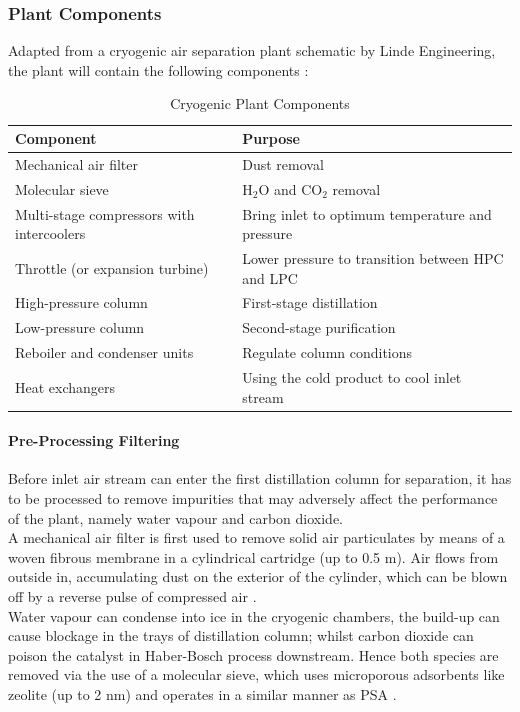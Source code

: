 \documentclass[11pt,oneside]{article}
\let\subsubsubsection\paragraph
\begin{document}
	\subsubsection{Plant Components} \noindent
    Adapted from a cryogenic air separation plant schematic by Linde Engineering, the plant will contain the following components \citep{linde_cryo}:
    \begin{table}[ht]
        \singlespacing
    	\centering
	    \caption{Cryogenic Plant Components}
	    \label{table:plant_components}

	    \begin{tabular}{|l|l|}
	    \hline
	    Component						& Purpose \\        \hline
	    Mechanical air filter 			& Dust removal \\
	    Molecular sieve					& H$_2$O and CO$_2$ removal \\
	    Multi-stage compressors with intercoolers & Bring inlet to optimum temperature and pressure\\
	    Throttle (or expansion turbine)	& Lower pressure to transition between HPC and LPC\\
	    High-pressure column			& First-stage distillation \\
	    Low-pressure column				& Second-stage purification \\
	    Reboiler and condenser units	& Regulate column conditions\\
	    Heat exchangers					& Using the cold product to cool inlet stream \\  \hline
	    \end{tabular}
    \end{table}
		\subsubsubsection{Pre-Processing Filtering}
        Before inlet air stream can enter the first distillation column for separation, it has to be processed to remove impurities that may adversely affect the performance of the plant, namely water vapour and carbon dioxide. \\
        A mechanical air filter is first used to remove solid air particulates by means of a woven fibrous membrane in a cylindrical cartridge (up to 0.5 \textmu m). Air flows from outside in, accumulating dust on the exterior of the cylinder, which can be blown off by a reverse pulse of compressed air \citep{airfilter}.\\
        Water vapour can condense into ice in the cryogenic chambers, the build-up can cause blockage in the trays of distillation column; whilst carbon dioxide can poison the catalyst in Haber-Bosch process downstream. Hence both species are removed via the use of a molecular sieve, which uses microporous adsorbents like zeolite (up to 2 nm) and operates in a similar manner as PSA \citep{white2017}.
\end{document}
